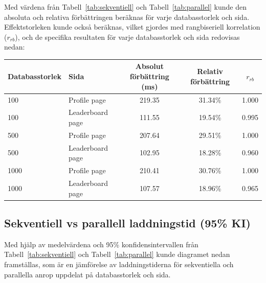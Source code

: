 \documentclass[letterpaper,twocolumn,10pt]{article}
\begin{document}
\noindent
\begin{minipage}[t]{\columnwidth}

Med värdena från Tabell~\ref{tab:sekventiell} och Tabell~\ref{tab:parallel}
kunde den absoluta och relativa förbättringen beräknas för varje databasstorlek och
sida. Effektstorleken kunde också beräknas, vilket gjordes med rangbiseriell
korrelation ($r_{rb}$),
och de specifika resultaten för varje databasstorlek och sida redovisas nedan:
\end{minipage}

\vspace*{-0.2\baselineskip}

\begin{strip}
  \centering
  \small
  \setlength{\tabcolsep}{6pt}
    \begin{tabular}{@{}l l c c c@{}}
        \toprule
            Databasstorlek & Sida & Absolut förbättring (ms) & Relativ förbättring & $r_{rb}$   \\
        \midrule
            100 & Profile page  & 219.35   & 31.34\% & 1.000   \\
            100 & Leaderboard page    & 111.55    & 19.54\% & 0.995   \\
            500 & Profile page  & 207.64   & 29.51\% & 1.000   \\
            500 & Leaderboard page    & 102.95    & 18.28\% & 0.960   \\
            1000 & Profile page  & 210.41   & 30.76\% & 1.000   \\
            1000 & Leaderboard page    & 107.57    & 18.96\% & 0.965   \\
        \bottomrule
    \end{tabular}
  \label{tab:comparison}
\end{strip}


\subsection{Sekventiell vs parallell laddningstid (95\% KI)}

\noindent
\begin{minipage}[t]{\columnwidth}
 Med hjälp av medelvärdena och 95\% konfidensintervallen från Tabell~\ref{tab:sekventiell} och Tabell~\ref{tab:parallel} kunde diagramet nedan framställas, som är en jämförelse av laddningstiderna för sekventiella och parallella anrop uppdelat på databasstorlek och sida.
\end{minipage}
\end{document}
